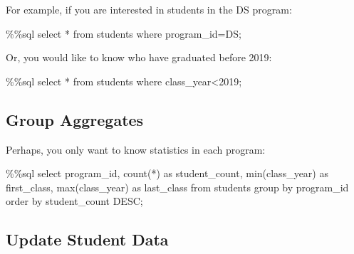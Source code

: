 \documentclass[
  letterpaper,
]{scrbook}
\newenvironment{Shaded}{\begin{snugshade}}{\end{snugshade}}
\newcommand{\BuiltInTok}[1]{\textcolor[rgb]{0.00,0.23,0.31}{#1}}
\newcommand{\DecValTok}[1]{\textcolor[rgb]{0.68,0.00,0.00}{#1}}
\newcommand{\ImportTok}[1]{\textcolor[rgb]{0.00,0.46,0.62}{#1}}
\newcommand{\NormalTok}[1]{\textcolor[rgb]{0.00,0.23,0.31}{#1}}
\newcommand{\OperatorTok}[1]{\textcolor[rgb]{0.37,0.37,0.37}{#1}}
\newcommand{\StringTok}[1]{\textcolor[rgb]{0.13,0.47,0.30}{#1}}
\begin{document}
For example, if you are interested in students in the DS program:

\begin{Shaded}
\begin{Highlighting}[]
\OperatorTok{\%\%}\NormalTok{sql}
\NormalTok{select }\OperatorTok{*} \ImportTok{from}\NormalTok{ students where program\_id}\OperatorTok{=}\StringTok{\textquotesingle{}DS\textquotesingle{}}\OperatorTok{;}
\end{Highlighting}
\end{Shaded}

Or, you would like to know who have graduated before 2019:

\begin{Shaded}
\begin{Highlighting}[]
\OperatorTok{\%\%}\NormalTok{sql}
\NormalTok{select }\OperatorTok{*} \ImportTok{from}\NormalTok{ students where class\_year}\OperatorTok{\textless{}}\DecValTok{2019}\OperatorTok{;}
\end{Highlighting}
\end{Shaded}

\subsection*{Group Aggregates}\label{group-aggregates}

Perhaps, you only want to know statistics in each program:

\begin{Shaded}
\begin{Highlighting}[]
\OperatorTok{\%\%}\NormalTok{sql}
\NormalTok{select program\_id, }
\NormalTok{       count(}\OperatorTok{*}\NormalTok{) }\ImportTok{as}\NormalTok{ student\_count, }
       \BuiltInTok{min}\NormalTok{(class\_year) }\ImportTok{as}\NormalTok{ first\_class, }
       \BuiltInTok{max}\NormalTok{(class\_year) }\ImportTok{as}\NormalTok{ last\_class}
\ImportTok{from}\NormalTok{ students }
\NormalTok{group by program\_id}
\NormalTok{order by student\_count DESC}\OperatorTok{;}
\end{Highlighting}
\end{Shaded}

\subsection*{Update Student Data}\label{update-student-data}
\end{document}
